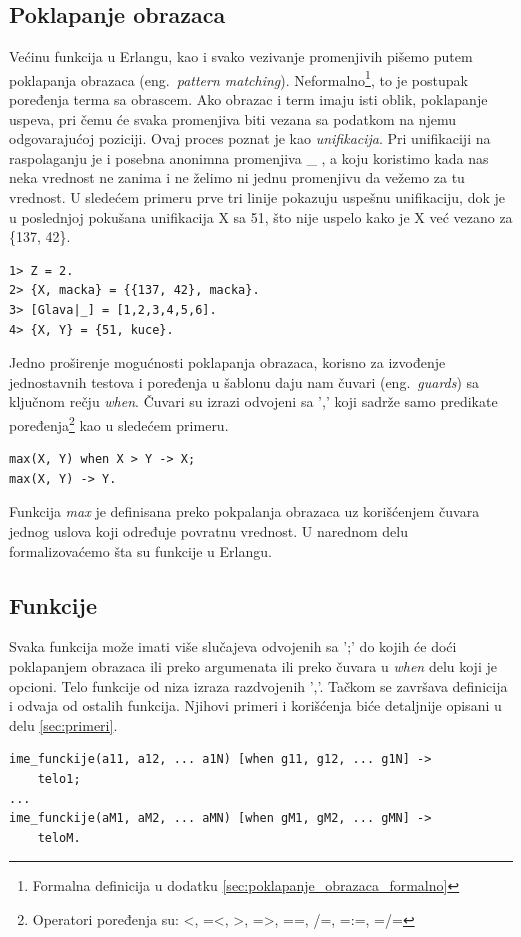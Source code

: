 \documentclass[a4paper]{article}
\begin{document}
\subsection{Poklapanje obrazaca}
Većinu funkcija u Erlangu, kao i svako vezivanje promenjivih pišemo putem poklapanja obrazaca (eng.~{\em pattern matching}). Neformalno\footnote{ Formalna definicija u dodatku \ref{sec:poklapanje_obrazaca_formalno}}, to je postupak poređenja terma sa obrascem. Ako obrazac i term imaju isti oblik, poklapanje uspeva, pri čemu će svaka promenjiva biti vezana sa podatkom na njemu odgovarajućoj poziciji. 
Ovaj proces poznat je kao {\em unifikacija}. 
Pri unifikaciji na raspolaganju je i posebna anonimna promenjiva \_ , a koju koristimo kada nas neka vrednost ne zanima i ne želimo ni jednu promenjivu da vežemo za tu vrednost. U sledećem primeru prve tri linije pokazuju uspešnu unifikaciju, dok je u poslednjoj pokušana unifikacija X sa 51, što nije uspelo kako je X već vezano za \{137, 42\}.

\begin{verbatim}
1> Z = 2.
2> {X, macka} = {{137, 42}, macka}.
3> [Glava|_] = [1,2,3,4,5,6].
4> {X, Y} = {51, kuce}.
\end{verbatim}

Jedno proširenje mogućnosti poklapanja obrazaca, korisno za izvođenje jednostavnih testova i poređenja u šablonu daju nam čuvari (eng.~{\em guards}) sa ključnom rečju {\em when}. Čuvari su izrazi odvojeni sa ',' koji sadrže samo predikate poređenja\footnote{ Operatori poređenja su: <, =<, >, =>, ==, /=, =:=, =/=} kao u sledećem primeru.
\begin{verbatim}
max(X, Y) when X > Y -> X;
max(X, Y) -> Y.
\end{verbatim}
Funkcija {\em max} je definisana preko pokpalanja obrazaca uz korišćenjem čuvara jednog uslova koji određuje povratnu vrednost. U narednom delu formalizovaćemo šta su funkcije u Erlangu.


\subsection{Funkcije}
Svaka funkcija može imati više slučajeva odvojenih sa ';' 
do kojih će doći poklapanjem obrazaca ili preko argumenata ili preko čuvara u {\em when} delu koji je opcioni. 
Telo funkcije od niza izraza razdvojenih ','.
Tačkom se završava definicija i odvaja od ostalih funkcija. 
Njihovi primeri i korišćenja biće detaljnije opisani u delu \ref{sec:primeri}.
\begin{verbatim}
ime_funckije(a11, a12, ... a1N) [when g11, g12, ... g1N] -> 
	telo1;
...
ime_funckije(aM1, aM2, ... aMN) [when gM1, gM2, ... gMN] -> 
	teloM.
\end{verbatim}
\end{document}
